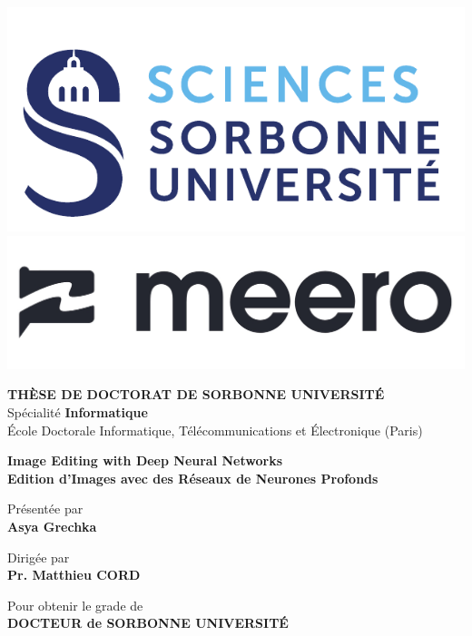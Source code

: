 \begin{titlepage}

  \vspace*{-2.5cm}
  \includegraphics[height=0.15\columnwidth]{images/sorbonne.pdf}
  \hspace*{2.5cm}
  \includegraphics[height=0.10\columnwidth]{images/meero.jpg}
  \vspace*{0.5cm}

  \begin{center}

    {\large \textbf{T\normalsize{HÈSE DE}\large{} D\normalsize{OCTORAT DE}\large{} S\normalsize{ORBONNE}\large{} U\normalsize{NIVERSITÉ}}}\\
    Spécialité \textbf{Informatique}\\
    École Doctorale Informatique, Télécommunications et Électronique (Paris)

    \vspace*{1.5cm}

    {\Large \textbf{Image Editing with Deep Neural Networks}} \\[0.5em]
    {\large \textbf{Edition d’Images avec des Réseaux de Neurones Profonds}}

    \vspace*{1.2cm}

    Présentée par\\
    {\large \textbf{Asya {Grechka}}}

    \vspace*{2mm}

    Dirigée par\\
    \textbf{Pr. Matthieu {CORD}}

    \vspace*{5mm}

    Pour obtenir le grade de \ \\
    \textbf{DOCTEUR de SORBONNE UNIVERSITÉ} \ \\

    \vspace*{5mm}

  \end{center}


\end{titlepage}
